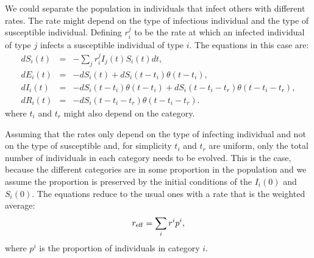 \documentclass[a4paper,oneside,11pt]{article}
\begin{document}
We could separate the population in individuals that infect others with different rates. The rate might depend on the type of infectious individual and the type of susceptible individual. Defining $r^{j}_{i}$ to be the rate at which an infected individual of type $j$ infects a susceptible individual of type $i$. The equations in this case are:
\begin{eqnarray}
d S_i(t) &=& - \sum_j r^j_{i}  I_j(t) S_i(t) dt, \nonumber\\
d E_i(t) &=& -d S_i(t) + d S_i(t-t_i) \theta(t-t_i) ,\nonumber\\
d I_i(t) &=& -d S_i(t-t_i) \theta(t-t_i)+ d S_i(t-t_i-t_r) \theta(t-t_i-t_r),\nonumber\\
d R_i(t) &=& - d S_i(t - t_i - t_r) \theta(t-t_i-t_r).\nonumber
\end{eqnarray}
where $t_i$ and $t_r$ might also depend on the category.

Assuming that the rates only depend on the type of infecting individual and not on the type of susceptible and, for simplicity $t_i$ and $t_r$ are uniform, only the total number of individuals in each category needs to be evolved. This is the case, because the different categories are in some proportion in the population and we assume the proportion is preserved by
 the initial conditions of the $I_i(0)$ and $S_i(0)$. The equations reduce to the usual ones with a rate that is the weighted average:
 \begin{eqnarray}
 r_{\rm eff} = \sum_i r^i p^i,
 \end{eqnarray}
 where $p^i$ is the proportion of individuals in category $i$.
\end{document}
